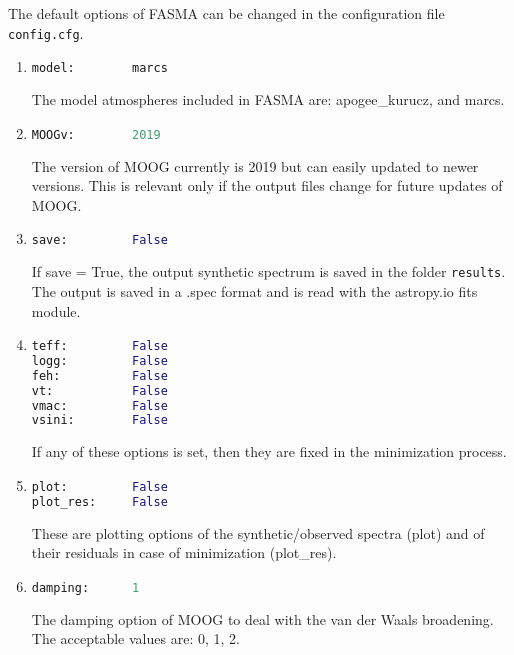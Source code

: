\documentclass[a4paper,12pt]{article}
\begin{document}
The default options of FASMA can be changed in the configuration file \texttt{config.cfg}.
\begin{enumerate}

\item
\begin{lstlisting}[language=Python]
model:        marcs
\end{lstlisting}
The model atmospheres included in FASMA are: apogee\_kurucz, and marcs.

\item
\begin{lstlisting}[language=Python]
MOOGv:        2019
\end{lstlisting}

The version of MOOG currently is 2019 but can easily updated to newer versions. This is relevant only if the output files change for future updates of MOOG.

\item
\begin{lstlisting}[language=Python]
save:         False
\end{lstlisting}
If save = True, the output synthetic spectrum is saved in the folder \texttt{results}. The output is saved in a .spec format and is read with the astropy.io fits module.

\item
\begin{lstlisting}[language=Python]
teff:         False
logg:         False
feh:          False
vt:           False
vmac:         False
vsini:        False
\end{lstlisting}
If any of these options is set, then they are fixed in the minimization process. 

\item
\begin{lstlisting}[language=Python]
plot:         False
plot_res:     False
\end{lstlisting}
These are plotting options of the synthetic/observed spectra (plot) and of their residuals in case of minimization (plot\_res).

\item
\begin{lstlisting}[language=Python]
damping:      1
\end{lstlisting}
The damping option of MOOG to deal with the van der Waals broadening. The acceptable values are: 0, 1, 2.


\end{enumerate}
\end{document}
